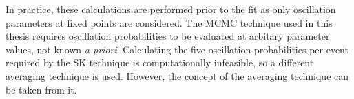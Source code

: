 In practice, these calculations are performed prior to the fit as only oscillation parameters at fixed points are considered. The MCMC technique used in this thesis requires oscillation probabilities to be evaluated at arbitary parameter values, not known \textit{a priori}. Calculating the five oscillation probabilities per event required by the SK technique is computationally infeasible, so a different averaging technique is used. However, the concept of the averaging technique can be taken from it.



